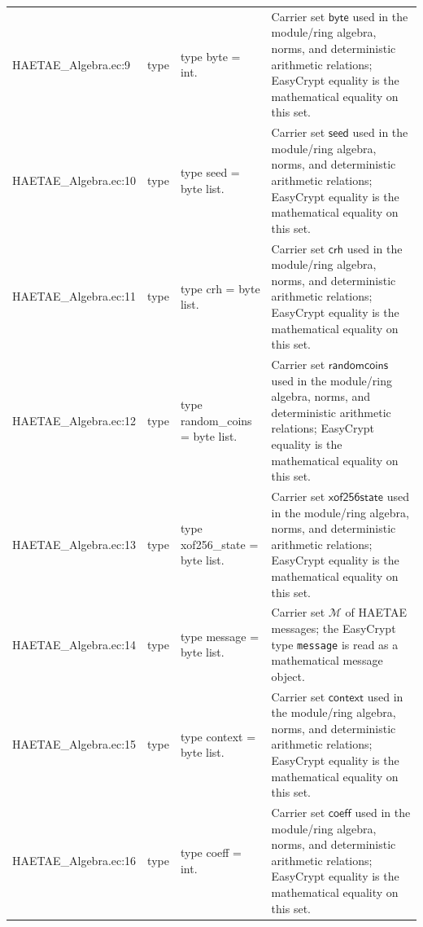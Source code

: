 \documentclass[10pt]{article}
\newcommand{\EC}[1]{\texttt{#1}}
\begin{document}
\begin{longtable}{L{0.11\textwidth}L{0.055\textwidth}L{0.385\textwidth}L{0.41\textwidth}}
HAETAE\_\allowbreak{}Algebra.\allowbreak{}ec:\allowbreak{}9 & type & {\ttfamily\scriptsize type byte = int.} & Carrier set $\mathsf{byte}$ used in the module/ring algebra, norms, and deterministic arithmetic relations; EasyCrypt equality is the mathematical equality on this set. \\
HAETAE\_\allowbreak{}Algebra.\allowbreak{}ec:\allowbreak{}10 & type & {\ttfamily\scriptsize type seed = byte list.} & Carrier set $\mathsf{seed}$ used in the module/ring algebra, norms, and deterministic arithmetic relations; EasyCrypt equality is the mathematical equality on this set. \\
HAETAE\_\allowbreak{}Algebra.\allowbreak{}ec:\allowbreak{}11 & type & {\ttfamily\scriptsize type crh = byte list.} & Carrier set $\mathsf{crh}$ used in the module/ring algebra, norms, and deterministic arithmetic relations; EasyCrypt equality is the mathematical equality on this set. \\
HAETAE\_\allowbreak{}Algebra.\allowbreak{}ec:\allowbreak{}12 & type & {\ttfamily\scriptsize type random\_\allowbreak{}coins = byte list.} & Carrier set $\mathsf{randomcoins}$ used in the module/ring algebra, norms, and deterministic arithmetic relations; EasyCrypt equality is the mathematical equality on this set. \\
HAETAE\_\allowbreak{}Algebra.\allowbreak{}ec:\allowbreak{}13 & type & {\ttfamily\scriptsize type xof256\_\allowbreak{}state = byte list.} & Carrier set $\mathsf{xof256state}$ used in the module/ring algebra, norms, and deterministic arithmetic relations; EasyCrypt equality is the mathematical equality on this set. \\
HAETAE\_\allowbreak{}Algebra.\allowbreak{}ec:\allowbreak{}14 & type & {\ttfamily\scriptsize type message = byte list.} & Carrier set $\mathcal M$ of HAETAE messages; the EasyCrypt type \EC{message} is read as a mathematical message object. \\
HAETAE\_\allowbreak{}Algebra.\allowbreak{}ec:\allowbreak{}15 & type & {\ttfamily\scriptsize type context = byte list.} & Carrier set $\mathsf{context}$ used in the module/ring algebra, norms, and deterministic arithmetic relations; EasyCrypt equality is the mathematical equality on this set. \\
HAETAE\_\allowbreak{}Algebra.\allowbreak{}ec:\allowbreak{}16 & type & {\ttfamily\scriptsize type coeff = int.} & Carrier set $\mathsf{coeff}$ used in the module/ring algebra, norms, and deterministic arithmetic relations; EasyCrypt equality is the mathematical equality on this set. \\

\end{longtable}
\end{document}
